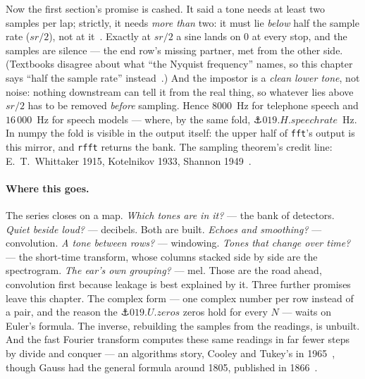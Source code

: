\begin{narrative}
Now the first section's promise is cashed. It said a tone needs at least
two samples per lap; strictly, it needs \emph{more than} two: it must lie
\emph{below} half the
sample rate ($sr/2$), not at
it~\cite{signal_processing-j-o-smith-mdft-sampling-theorem}. Exactly at
$sr/2$ a sine lands on $0$ at every stop, and the samples are silence —
the end row's missing partner, met from the other side. (Textbooks
disagree about what ``the Nyquist frequency'' names, so this chapter
says ``half the sample rate''
instead~\cite{signal_processing-oppenheim-schafer-discrete-time-signal-processing-3rd-ed}.)
And the impostor is a \emph{clean lower tone}, not noise: nothing
downstream can tell it from the real thing, so whatever lies above
$sr/2$ has to be removed \emph{before} sampling. Hence $8000$~Hz for
telephone speech and $16\,000$~Hz for speech models — where, by the same
fold, $\anchor{019.H.speechrate}$~Hz. In numpy the fold is visible in
the output itself: the upper half of \texttt{fft}'s output is this
mirror, and \texttt{rfft} returns the bank. The sampling theorem's credit
line: E.~T.~Whittaker 1915, Kotelnikov 1933, Shannon
1949~\cite{signal_processing-shannon-communication-in-the-presence-of-noise-1949,signal_processing-l-ke-the-origins-of-the-sampling-theorem-1999}.

\paragraph{Where this goes.} The series closes on a map. \emph{Which
tones are in it?} — the bank of detectors. \emph{Quiet beside loud?} —
decibels. Both are built. \emph{Echoes and smoothing?} —
convolution. \emph{A tone between rows?} — windowing. \emph{Tones that
change over time?} — the short-time transform, whose columns stacked
side by side are the spectrogram. \emph{The ear's own grouping?} — mel.
Those are the road ahead, convolution first because leakage is best
explained by it. Three further promises leave
this chapter. The complex form — one complex number per row instead of
a pair, and the reason the $\anchor{019.U.zeros}$ zeros hold for every
$N$ — waits on Euler's formula. The inverse, rebuilding the samples
from the readings, is unbuilt. And the fast Fourier transform computes
these same readings in far fewer steps by divide and conquer — an
algorithms story, Cooley and Tukey's in
1965~\cite{signal_processing-cooley-tukey-an-algorithm-for-the-machine-calculation-1965},
though Gauss had the general formula around 1805, published in
1866~\cite{signal_processing-heideman-johnson-burrus-gauss-and-the-history-of-the-fft}.
\end{narrative}


